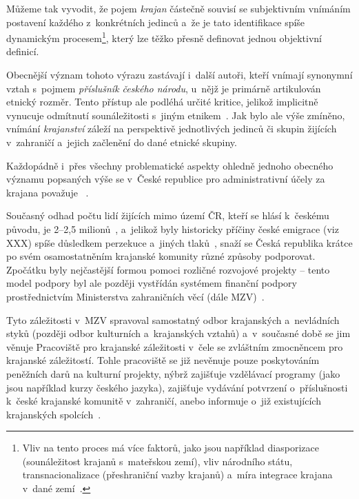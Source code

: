 Můžeme tak vyvodit, že pojem \emph{krajan} částečně souvisí se subjektivním vnímáním postavení každého z~konkrétních jedinců a~že je tato identifikace spíše dynamickým procesem\footnote{Vliv na tento proces má více faktorů, jako jsou například diasporizace (sounáležitost krajanů s~mateřskou zemí), vliv národního státu, transnacionalizace (přeshraniční vazby krajanů) a~míra integrace krajana v~dané zemí~\parencite{Broucek2017}.}, který lze těžko přesně definovat jednou objektivní definicí.

Obecnější význam tohoto výrazu zastávají i~další autoři, kteří vnímají synonymní vztah s~pojmem \emph{příslušník českého národu}, u~nějž je primárně artikulován etnický rozměr. Tento přístup ale podléhá určité kritice, jelikož implicitně vynucuje odmítnutí sounáležitosti s~jiným etnikem~\parencite{Jakoubek2015}. Jak bylo ale výše zmíněno, vnímání \emph{krajanství} záleží na perspektivě jednotlivých jedinců či skupin žijících v~zahraničí a~jejich začlenění do dané etnické skupiny.

Každopádně i~přes všechny problematické aspekty ohledně jednoho obecného významu popsaných výše se v~České republice pro administrativní účely za krajana považuje ~\parencite{Krajane-mv1}.

Současný odhad počtu lidí žijících mimo území ČR, kteří se hlásí k~českému původu, je 2--2,5 milionů~\parencite{Krajane-mv2}, a~jelikož byly historicky příčiny české emigrace (viz XXX) spíše důsledkem perzekuce a~jiných tlaků~\parencite{Vaculik2009a}, snaží se Česká republika krátce po svém osamostatněním krajanské komunity různé způsoby podporovat. Zpočátku byly nejčastější formou pomoci rozličné rozvojové projekty -- tento model podpory byl ale později vystřídán systémem finanční podpory prostřednictvím Ministerstva zahraničních věcí (dále MZV)~\parencite{Broucek2009}.

Tyto záležitosti v~MZV spravoval samostatný odbor krajanských a~nevládních styků (později odbor kulturních a~krajanských vztahů) a~v~současné době se jim věnuje Pracoviště pro krajanské záležitosti v~čele se zvláštním zmocněncem pro krajanské záležitostí. Tohle pracoviště se již nevěnuje pouze poskytováním peněžních darů na kulturní projekty, nýbrž zajišťuje vzdělávací programy (jako jsou například kurzy českého jazyka), zajišťuje vydávání potvrzení o~příslušnosti k~české krajanské komunitě v~zahraničí, anebo informuje o~již existujících krajanských spolcích~\parencite{Krajane-mv3}.

